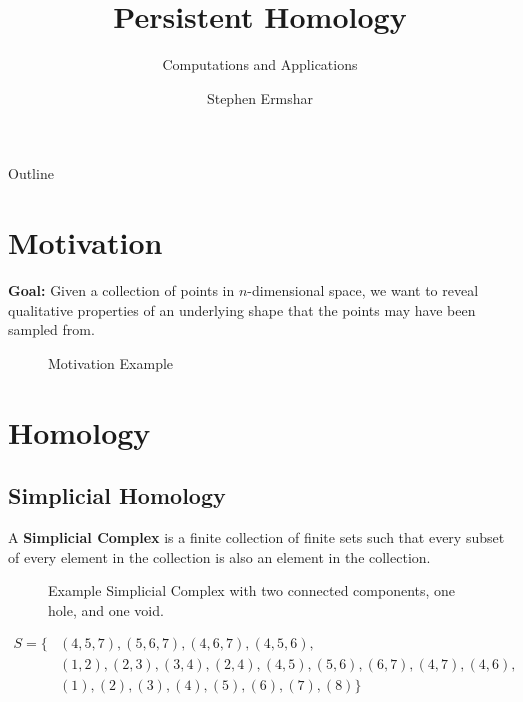 

\title{Persistent Homology}
\subtitle{Computations and Applications}
\author{Stephen Ermshar}
\date{}






\begin{frame}
    \titlepage
\end{frame}

\begin{frame}{Outline}
	\tableofcontents
\end{frame}

\section[Motivation]{Motivation}
\begin{frame}
	\textbf{Goal:} Given a collection of points in \(n\)-dimensional space, we want to reveal qualitative properties of an underlying shape that the points may have been sampled from.

	\begin{figure}
		
		\caption{Motivation Example}
	\end{figure}
\end{frame}

\section[Homology]{Homology}
\subsection{Simplicial Homology}
\begin{frame}
	\begin{definition}
		A \textbf{Simplicial Complex} is a finite collection of finite sets such that every subset of every element in the collection is also an element in the collection. \cite{wagner}
	\end{definition}
	\begin{figure}
		
		\caption{Example Simplicial Complex with two connected components, one hole, and one void.}
	\end{figure}
	\begin{align*}
		S = \{
			&(4,5,7), (5,6,7), (4,6,7), (4,5,6),\\
			&(1,2), (2,3), (3,4), (2,4), (4,5), (5,6),
			(6,7), (4,7),(4,6),\\
			&(1), (2), (3), (4), (5), (6), (7), (8)
		\}
	\end{align*}
\end{frame}

